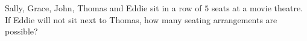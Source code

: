 Sally, Grace, John, Thomas and Eddie sit in a row of $5$ seats at a movie theatre. If Eddie will not sit next to Thomas, how many seating arrangements are possible?
